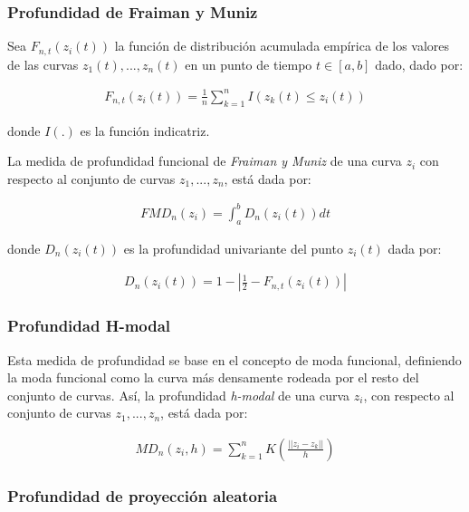 \documentclass[
]{book}
\begin{document}
\hypertarget{profundidad-de-fraiman-y-muniz}{%
\subsubsection*{Profundidad de Fraiman y Muniz}\label{profundidad-de-fraiman-y-muniz}}

Sea \(F_{n,t}(z_i(t))\) la función de distribución acumulada empírica de los valores de las curvas \(z_1(t),...,z_n(t)\) en un punto de tiempo \(t\in [a,b]\) dado, dado por:

\begin{align}
    F_{n,t}(z_i(t))=\frac{1}{n}\sum_{k=1}^n I(z_k(t)\leq z_i(t))
\end{align}

donde \(I(.)\) es la función indicatriz.

La medida de profundidad funcional de \emph{Fraiman y Muniz} de una curva \(z_i\) con respecto al conjunto de curvas \(z_1,...,z_n\), está dada por:

\begin{align}
    FMD_n(z_i)=\int_a^bD_n(z_i(t))dt
\end{align}

donde \(D_n(z_i(t))\) es la profundidad univariante del punto \(z_i(t)\) dada por:

\begin{align}
    D_n(z_i(t))=1-\left|\frac{1}{2}-F_{n,t}(z_i(t))\right|
\end{align}

\hypertarget{profundidad-h-modal}{%
\subsubsection*{Profundidad H-modal}\label{profundidad-h-modal}}

Esta medida de profundidad se base en el concepto de moda funcional, definiendo la moda funcional como la curva más densamente rodeada por el resto del conjunto de curvas. Así, la profundidad \emph{h-modal} de una curva \(z_i\), con respecto al conjunto de curvas \(z_1,...,z_n\), está dada por:

\begin{align}
    MD_n(z_i,h)=\sum_{k=1}^n  K\left( \frac{||z_i-z_k||}{h}\right)
\end{align}

\hypertarget{profundidad-de-proyecciuxf3n-aleatoria}{%
\subsubsection*{Profundidad de proyección aleatoria}\label{profundidad-de-proyecciuxf3n-aleatoria}}
\end{document}
